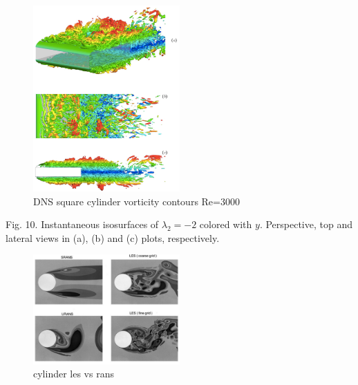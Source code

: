 \documentclass[journal]{new-aiaa}
\begin{document}
\begin{figure}[H]
\begin{center}
\includegraphics[width=0.5\textwidth]{Images/logan/cimarelli2018direct_vorticity.pdf}
\caption{ DNS square cylinder vorticity contours Re=3000 \cite{cimarelli2018direct} }
\label{fig:dnsRectCylPressure}
\end{center}
\end{figure}

Fig. 10. Instantaneous isosurfaces of $\lambda_2=-2$ colored with $y$. Perspective, top and lateral views in (a), (b) and (c) plots, respectively.




















\begin{figure}[H]
\begin{center}
\includegraphics[width=0.5\textwidth]{Images/logan/spalart2000strategies_CylinderLESvsRANS.pdf}
\caption{ cylinder les vs rans \cite{spalart2000strategies} }
\label{fig:lesvsranscylinder}
\end{center}
\end{figure}
\end{document}
